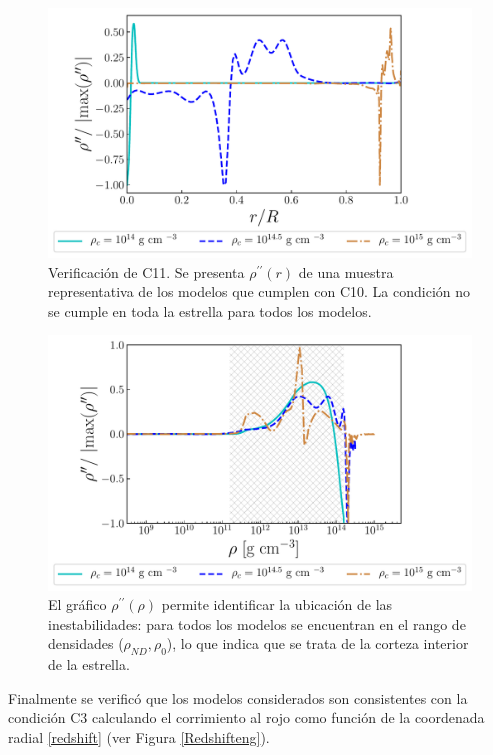 \begin{figure}[H]
    \centering
    \includegraphics[width=0.93\linewidth]{figures/ConvecStabilityeng.pdf}
    \caption{Verificación de C11. Se presenta $\rho^{\prime\prime}(r)$ de una muestra representativa de los modelos que cumplen con C10. La condición no se cumple en toda la estrella para todos los modelos. }
    \label{ConvecStabilityeng}
\end{figure}
\begin{figure}[H]
    \centering
    \includegraphics[width=0.93\linewidth]{figures/ConvecStabilityengCorrel.pdf}
    \caption{El gráfico $\rho^{\prime\prime}(\rho)$ permite identificar la ubicación de las inestabilidades: para todos los modelos se encuentran en el rango de densidades ($\rho_{ND},\rho_0$), lo que indica que se trata de la corteza interior de la estrella.} 
    \label{ConvecStabilityengCorrel}
\end{figure}

Finalmente se verificó que los modelos considerados son consistentes con la condición C3 calculando el corrimiento al rojo como función de la coordenada radial \eqref{redshift} (ver Figura \ref{Redshifteng}). 

